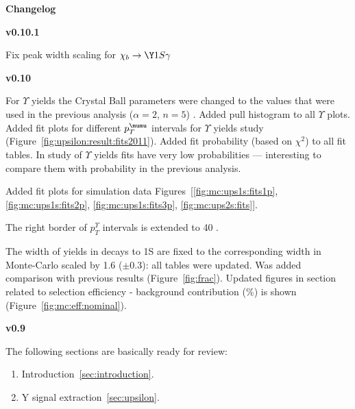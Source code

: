 {\noindent\bf\Large Changelog}

\begingroup
\fontsize{7pt}{12pt}\selectfont

{\bf v0.10.1}

Fix peak width scaling for $\chi_b \to \Y1S \gamma$

{\bf v0.10}

For $\Upsilon$ yields the Crystal Ball parameters were changed to the values that
were used in the previous analysis ($\alpha=2$, $n=5$) . Added pull histogram to
all $\Upsilon$ plots. Added fit plots for different $p_T^{\mumu}$ intervals for
$\Upsilon$ yields study (Figure~\ref{fig:upsilon:result:fits2011}). Added fit
probability (based on $\chi^2$) to all fit tables. In study of $\Upsilon$ yields
fits have very low probabilities --- interesting to compare them with
probability in the previous analysis.

Added fit plots for simulation data
Figures~[\ref{fig:mc:ups1s:fits1p},\ref{fig:mc:ups1s:fits2p}, \ref{fig:mc:ups1s:fits3p},
\ref{fig:mc:ups2s:fits}].

The right border of $p_T^{\Upsilon}$ intervals is extended to 40 \gevc.

The width of \chib yields in decays to \Y1S are fixed to the corresponding width
in Monte-Carlo scaled by 1.6 ($\pm 0.3$): all tables were updated.
Was added comparison with previous results (Figure~\ref{fig:frac}).
Updated figures in section related to selection efficiency - background
contribution (\%) is shown (Figure~\ref{fig:mc:eff:nominal}).




{\bf v0.9}

The following sections are basically ready for review:
\begin{enumerate}
\item Introduction~\ref{sec:introduction}.
\item Y signal extraction~\ref{sec:upsilon}.
\end{enumerate}
\endgroup
